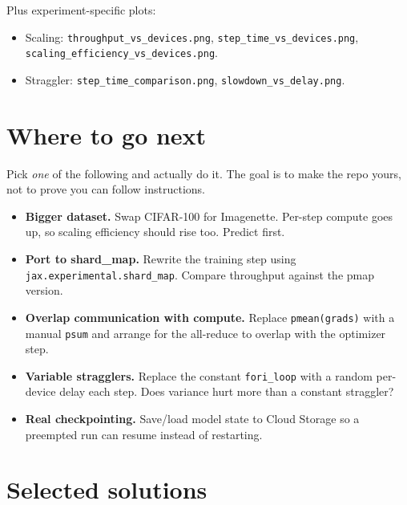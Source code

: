 \documentclass[11pt,a4paper]{article}
\newcounter{lab}
\begin{document}
Plus experiment-specific plots:
\begin{itemize}
\item Scaling: \texttt{throughput\_vs\_devices.png}, \texttt{step\_time\_vs\_devices.png},
      \texttt{scaling\_efficiency\_vs\_devices.png}.
\item Straggler: \texttt{step\_time\_comparison.png}, \texttt{slowdown\_vs\_delay.png}.
\end{itemize}

\section{Where to go next}

\begin{lab}
Pick \emph{one} of the following and actually do it. The goal is to make the repo yours,
not to prove you can follow instructions.
\begin{itemize}[leftmargin=*, itemsep=2pt]
\item \textbf{Bigger dataset.} Swap CIFAR-100 for Imagenette. Per-step compute goes up, so
      scaling efficiency should rise too. Predict first.
\item \textbf{Port to shard\_map.} Rewrite the training step using
      \texttt{jax.experimental.shard\_map}. Compare throughput against the pmap version.
\item \textbf{Overlap communication with compute.} Replace \texttt{pmean(grads)} with a
      manual \texttt{psum} and arrange for the all-reduce to overlap with the optimizer step.
\item \textbf{Variable stragglers.} Replace the constant \texttt{fori\_loop} with a
      random per-device delay each step. Does variance hurt more than a constant straggler?
\item \textbf{Real checkpointing.} Save/load model state to Cloud Storage so a preempted
      run can resume instead of restarting.
\end{itemize}
\end{lab}

\appendix
\section{Selected solutions}
\end{document}
